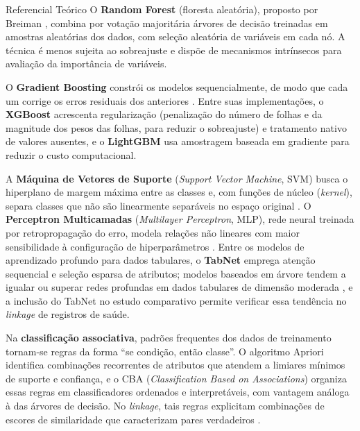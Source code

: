 \begin{chapter}{Referencial Teórico}
O \textbf{Random Forest} (floresta aleatória), proposto por Breiman \citeyearpar{Breiman2001rf}, combina por votação majoritária árvores de decisão treinadas em amostras aleatórias dos dados, com seleção aleatória de variáveis em cada nó. A técnica é menos sujeita ao sobreajuste e dispõe de mecanismos intrínsecos para avaliação da importância de variáveis.

O \textbf{Gradient Boosting} constrói os modelos sequencialmente, de modo que cada um corrige os erros residuais dos anteriores \cite{Hastie2009elements}. Entre suas implementações, o \textbf{XGBoost} \cite{Chen2016xgboost} acrescenta regularização (penalização do número de folhas e da magnitude dos pesos das folhas, para reduzir o sobreajuste) e tratamento nativo de valores ausentes, e o \textbf{LightGBM} \cite{Ke2017lightgbm} usa amostragem baseada em gradiente para reduzir o custo computacional.

A \textbf{Máquina de Vetores de Suporte} (\textit{Support Vector Machine}, SVM) busca o hiperplano de margem máxima entre as classes e, com funções de núcleo (\textit{kernel}), separa classes que não são linearmente separáveis no espaço original \cite{Hastie2009elements}. O \textbf{Perceptron Multicamadas} (\textit{Multilayer Perceptron}, MLP), rede neural treinada por retropropagação do erro, modela relações não lineares com maior sensibilidade à configuração de hiperparâmetros \cite{Hastie2009elements}. Entre os modelos de aprendizado profundo para dados tabulares, o \textbf{TabNet} \cite{Arik2021tabnet} emprega atenção sequencial e seleção esparsa de atributos; modelos baseados em árvore tendem a igualar ou superar redes profundas em dados tabulares de dimensão moderada \cite{Grinsztajn2022tabular, ShwartzZiv2022tabular}, e a inclusão do TabNet no estudo comparativo permite verificar essa tendência no \textit{linkage} de registros de saúde.

Na \textbf{classificação associativa}, padrões frequentes dos dados de treinamento tornam-se regras da forma ``se condição, então classe''. O algoritmo Apriori \cite{Agrawal1994apriori} identifica combinações recorrentes de atributos que atendem a limiares mínimos de suporte e confiança, e o CBA (\textit{Classification Based on Associations}) \cite{Liu1998cba} organiza essas regras em classificadores ordenados e interpretáveis, com vantagem análoga à das árvores de decisão. No \textit{linkage}, tais regras explicitam combinações de escores de similaridade que caracterizam pares verdadeiros \cite{Christen2012book}.


\end{chapter}
